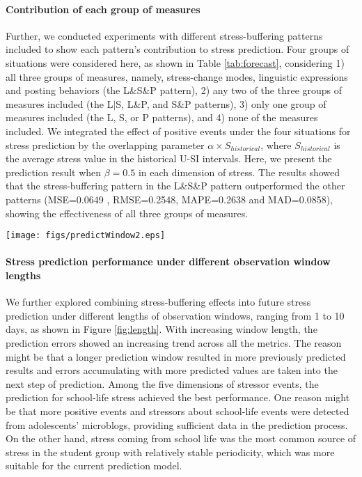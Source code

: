 \documentclass[5p,times,numbers,authoryear]{elsarticle}
\begin{document}
\paragraph{Contribution of each group of measures}
Further, we conducted experiments with different stress-buffering patterns included 
{to show each pattern's contribution to stress prediction.}
Four groups of situations were considered here, as shown in Table \ref{tab:forecast},
considering
1) all three groups of measures, namely, stress-change modes, linguistic expressions and posting behaviors (the L\&S\&P pattern),
2) any two of the three groups of measures included (the L$|$S, L\&P, and S\&P patterns),
3) only one group of measures included (the L, S, or P patterns),
and 4) none of the measures included.
We integrated the effect of positive events under the four situations for stress prediction by the overlapping parameter $\alpha \times S_{historical}$, 
where $S_{historical}$ is the average stress value in the historical U-SI intervals.
Here, we present the prediction result when $\beta = 0.5$ in each dimension of stress.
The results showed that the stress-buffering pattern in the L\&S\&P pattern outperformed the other patterns (MSE=0.0649 , RMSE=0.2548, MAPE=0.2638 and MAD=0.0858),
showing the effectiveness of all three groups of measures.
\begin{figure*}
\centering
\caption{Adolescents' stress prediction performance under different observation window lengths.}
\texttt{[image: figs/predictWindow2.eps]}
\label{fig:length}
\end{figure*}

\paragraph{Stress prediction performance under different observation window lengths}
We further explored combining stress-buffering effects into future stress prediction under different lengths of observation windows, ranging from 1 to 10 days, as shown in Figure \ref{fig:length}.
With increasing window length, the prediction errors showed an increasing trend across all the metrics.
The reason might be that a longer prediction window resulted in more previously predicted results and errors accumulating with more predicted values are taken into the next step of prediction.
Among the five dimensions of stressor events, the prediction for school-life stress achieved the best performance.
One reason might be that more positive events and stressors about school-life events were detected from adolescents' microblogs, providing sufficient data in the prediction process.
On the other hand, stress coming from school life was the most common source of stress in the student group 
with relatively stable periodicity,
which was more suitable for the current prediction model.
\end{document}
